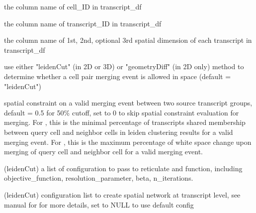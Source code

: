 \documentclass[letterpaper]{book}
\begin{document}
\begin{Arguments}
\begin{ldescription}
\item[\code{cellID\_coln}] the column name of cell\_ID in transcript\_df

\item[\code{transID\_coln}] the column name of transcript\_ID in transcript\_df

\item[\code{transSpatLocs\_coln}] the column name of 1st, 2nd, optional 3rd spatial dimension of each transcript in transcript\_df

\item[\code{spatialMergeCheck\_method}] use either "leidenCut" (in 2D or 3D) or "geometryDiff" (in 2D only) method to determine whether a cell pair merging event is allowed in space (default = "leidenCut")

\item[\code{cutoff\_spatialMerge}] spatial constraint on a valid merging event between two source transcript groups, default = 0.5 for 50\% cutoff, set to 0 to skip spatial constraint evaluation for merging.
For , this is the minimal percentage of transcripts shared membership between query cell and neighbor cells in leiden clustering results for a valid merging event.
For , this is the maximum percentage of white space change upon merging of query cell and neighbor cell for a valid merging event.

\item[\code{leiden\_config}] (leidenCut) a list of configuration to pass to reticulate and  function, including objective\_function, resolution\_parameter, beta, n\_iterations.

\item[\code{config\_spatNW\_transcript}] (leidenCut) configuration list to create spatial network at transcript level, see manual for  for more details, set to NULL to use default config
\end{ldescription}
\end{Arguments}
%
\end{document}
